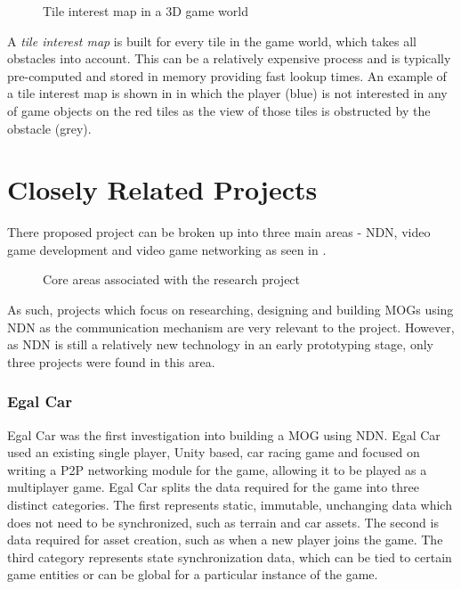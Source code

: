 \begin{figure}[H]
    \centering
    \caption{Tile interest map in a 3D game world}
    \label{fig:tile-im}
\end{figure}

 A \textit{tile interest map} is built for every tile in the game world, which takes all obstacles into account. This can be a relatively expensive process and is typically pre-computed and stored in memory providing fast lookup times. An example of a tile interest map is shown in  in which the player (blue) is not interested in any of game objects on the red tiles as the view of those tiles is obstructed by the obstacle (grey).   



\section{Closely Related Projects}\label{sec:sota:close-projects}
There proposed project can be broken up into three main areas - NDN, video game development and video game networking as seen in . 

\begin{figure}[H]
    \centering
    \caption{Core areas associated with the research project}
    \label{fig:venn}
\end{figure}

As such, projects which focus on researching, designing and building MOGs using NDN as the communication mechanism are very relevant to the project. However, as NDN is still a relatively new technology in an early prototyping stage, only three projects were found in this area.

\subsubsection*{Egal Car \cite{egal-car}}
Egal Car was the first investigation into building a MOG using NDN. Egal Car used an existing single player, Unity based, car racing game and focused on writing a P2P networking module for the game, allowing it to be played as a multiplayer game. Egal Car splits the data required for the game into three distinct categories. The first represents static, immutable, unchanging data which does not need to be synchronized, such as terrain and car assets. The second is data required for asset creation, such as when a new player joins the game. The third category represents state synchronization data, which can be tied to certain game entities or can be global for a particular instance of the game.

